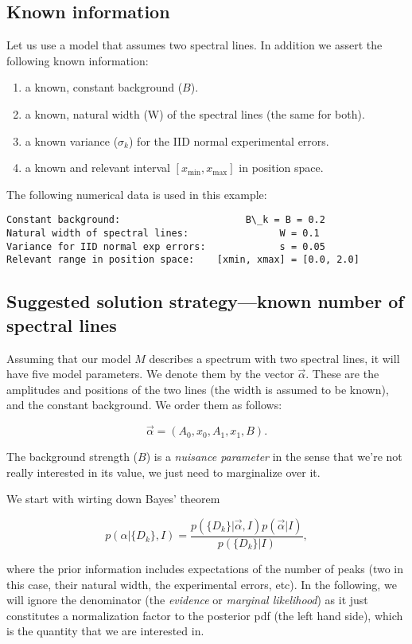 \documentclass{article}
\begin{document}
\subsection*{Known information}
%
Let us use a model that assumes two spectral lines. In addition we
assert the following known information: 
%
\begin{enumerate}
\item a known, constant background ($B$). 
\item a known, natural width
(W) of the spectral lines (the same for both). 
\item a known variance ($\sigma_k$) for the IID
normal experimental errors.
\item a known and relevant interval $[x_\mathrm{min},
x_\mathrm{max}]$ in position space.
\end{enumerate}
%
The following numerical data is used in this example:

    \begin{Verbatim}[commandchars=\\\{\}]
Constant background:                      B\_k = B = 0.2
Natural width of spectral lines:                W = 0.1
Variance for IID normal exp errors:             s = 0.05
Relevant range in position space:    [xmin, xmax] = [0.0, 2.0]
    \end{Verbatim}


\subsection*{Suggested solution strategy---known number of spectral lines}\label{solution-strategy}

Assuming that our model \(M\)  describes a spectrum with two spectral
lines, it will have five model parameters. We denote them by the vector
\(\vec{\alpha}\). These are the amplitudes and positions of the two
lines (the width is assumed to be known), and the
constant background. We order them as follows:

\[ \vec{\alpha} = (A_0, x_0, A_1, x_1, B).\]

The background strength ($B$) is a \emph{nuisance parameter} in the sense that
we're not really interested in its value, we just need to marginalize
over it.

    We start with wirting down Bayes' theorem

\[ p(\alpha | \{D_k\}, I) = \frac{p(\{D_k\} | \vec{\alpha}, I) p(\vec{\alpha}|I)}{p(\{D_k\} | I)},\]

where the prior information includes expectations of the number of peaks
(two in this case, their natural width, the experimental errors, etc).
In the following, we will ignore the denominator (the \emph{evidence} or
\emph{marginal likelihood}) as it just constitutes a normalization
factor to the posterior pdf (the left hand side), which is the quantity
that we are interested in.
\end{document}
